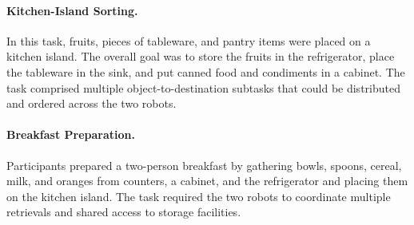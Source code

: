 \paragraph{Kitchen-Island Sorting.}
In this task, fruits, pieces of tableware, and pantry items were placed on a kitchen island.
The overall goal was to store the fruits in the refrigerator, place the tableware in the sink, and put canned food and condiments in a cabinet.
The task comprised multiple object-to-destination subtasks that could be distributed and ordered across the two robots.




\paragraph{Breakfast Preparation.}
Participants prepared a two-person breakfast by gathering bowls, spoons, cereal, milk, and oranges from counters, a cabinet, and the refrigerator and placing them on the kitchen island. 
The task required the two robots to coordinate multiple retrievals and shared access to storage facilities.

